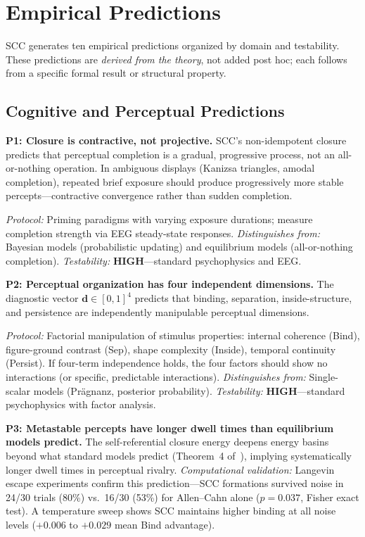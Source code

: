 \documentclass[lettersize,journal]{IEEEtran}
\begin{document}
\section{Empirical Predictions}

SCC generates ten empirical predictions organized by domain and testability. These predictions are \emph{derived from the theory}, not added post hoc; each follows from a specific formal result or structural property.

\subsection{Cognitive and Perceptual Predictions}

\textbf{P1: Closure is contractive, not projective.} SCC's non-idempotent closure predicts that perceptual completion is a gradual, progressive process, not an all-or-nothing operation. In ambiguous displays (Kanizsa triangles, amodal completion), repeated brief exposure should produce progressively more stable percepts---contractive convergence rather than sudden completion.

\emph{Protocol:} Priming paradigms with varying exposure durations; measure completion strength via EEG steady-state responses. \emph{Distinguishes from:} Bayesian models (probabilistic updating) and equilibrium models (all-or-nothing completion). \emph{Testability:} \textbf{HIGH}---standard psychophysics and EEG.

\textbf{P2: Perceptual organization has four independent dimensions.} The diagnostic vector $\mathbf{d} \in [0,1]^4$ predicts that binding, separation, inside-structure, and persistence are independently manipulable perceptual dimensions.

\emph{Protocol:} Factorial manipulation of stimulus properties: internal coherence (Bind), figure-ground contrast (Sep), shape complexity (Inside), temporal continuity (Persist). If four-term independence holds, the four factors should show no interactions (or specific, predictable interactions). \emph{Distinguishes from:} Single-scalar models (Pr\"{a}gnanz, posterior probability). \emph{Testability:} \textbf{HIGH}---standard psychophysics with factor analysis.

\textbf{P3: Metastable percepts have longer dwell times than equilibrium models predict.} The self-referential closure energy deepens energy basins beyond what standard models predict (Theorem~4 of~\cite{paper1}), implying systematically longer dwell times in perceptual rivalry. \emph{Computational validation:} Langevin escape experiments confirm this prediction---SCC formations survived noise in 24/30 trials (80\%) vs.\ 16/30 (53\%) for Allen--Cahn alone ($p = 0.037$, Fisher exact test). A temperature sweep shows SCC maintains higher binding at all noise levels ($+0.006$ to $+0.029$ mean Bind advantage).
\end{document}
